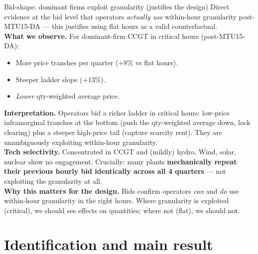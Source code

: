 \documentclass[10pt,aspectratio=169]{beamer}
\begin{document}
\begin{frame}{Bid-shape: dominant firms exploit granularity (justifies the design)}
  \footnotesize
  Direct evidence at the bid level that operators \emph{actually use} within-hour granularity post-MTU15-DA --- this justifies using flat hours as a valid counterfactual.\\[4pt]
  \textbf{What we observe.} For dominant-firm CCGT in critical hours (post-MTU15-DA):
  \begin{itemize}
    \item More price tranches per quarter ($+8\%$ vs flat hours).
    \item Steeper ladder slope ($+13\%$).
    \item \emph{Lower} qty-weighted average price.
  \end{itemize}
  \textbf{Interpretation.} Operators bid a richer ladder in critical hours: low-price inframarginal tranches at the bottom (push the qty-weighted average down, lock clearing) plus a steeper high-price tail (capture scarcity rent). They are unambiguously exploiting within-hour granularity.\\[4pt]
  \textbf{Tech selectivity.} Concentrated in CCGT and (mildly) hydro. Wind, solar, nuclear show no engagement. Crucially: many plants \textbf{mechanically repeat their previous hourly bid identically across all 4 quarters} --- not exploiting the granularity at all.\\[4pt]
  \textbf{Why this matters for the design.} Bids confirm operators \emph{can} and \emph{do} use within-hour granularity in the right hours. Where granularity is exploited (critical), we should see effects on quantities; where not (flat), we should not.
\end{frame}


\section{Identification and main result}
\end{document}
